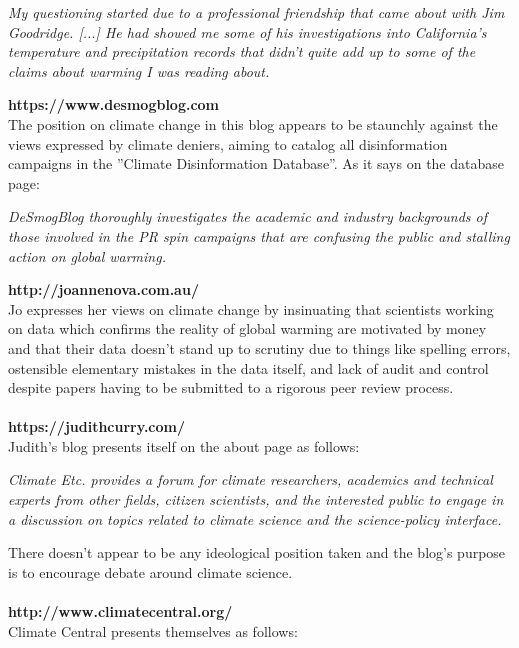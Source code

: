 \documentclass[11pt]{article}
\begin{document}
\begin{displayquote}
\textit{My questioning started due to a professional friendship that came
about with Jim Goodridge. [...] He had showed me some of his investigations into
California’s temperature and precipitation records that didn’t quite add up to some
of the claims about warming I was reading about.}
\end{displayquote}

\textbf{https://www.desmogblog.com}\\
The position on climate change in this blog appears to be staunchly against
the views expressed by climate deniers, aiming to catalog all disinformation
campaigns in the ''Climate Disinformation Database''. As it says on the
database page:

\begin{displayquote}
\textit{DeSmogBlog thoroughly investigates the academic and industry backgrounds of those
involved in the PR spin campaigns that are confusing the public and stalling action
on global warming.}
\end{displayquote}

\textbf{http://joannenova.com.au/}\\
Jo expresses her views on climate change by insinuating that scientists working on
data which confirms the reality of global warming are motivated by money and that
their data doesn't stand up to scrutiny due to things like spelling errors,
ostensible elementary mistakes in the data itself, and lack of audit and control
despite papers having to be submitted to a rigorous peer review process.\\
\\
\textbf{https://judithcurry.com/}\\
Judith's blog presents itself on the about page as follows:

\begin{displayquote}
\textit{Climate Etc. provides a forum for climate researchers, academics and technical experts
from other fields, citizen scientists, and the interested public to engage in a
discussion on topics related to climate science and the science-policy interface.}
\end{displayquote}

There doesn't appear to be any ideological position taken and the blog's purpose
is to encourage debate around climate science.\\
\\
\textbf{http://www.climatecentral.org/}\\
Climate Central presents themselves as follows:
\end{document}
